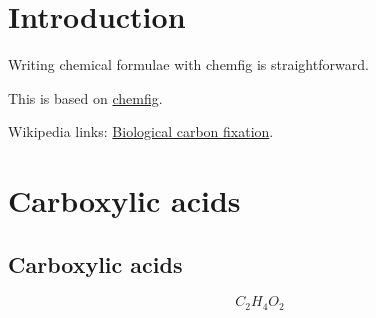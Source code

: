 \documentclass{article}
\begin{document}
\section{Introduction}
Writing chemical formulae with chemfig is straightforward.

This is based on \href{https://www.overleaf.com/learn/latex/Chemistry_formulae}{chemfig}.

Wikipedia links:
\href{https://en.wikipedia.org/wiki/Biological_carbon_fixation}{Biological carbon fixation}.



\section{Carboxylic acids}
\subsection{Carboxylic acids}
$$
C_2H_4O_2
$$
\end{document}
